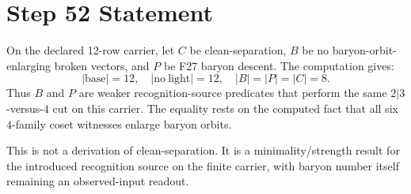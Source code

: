 \documentclass[11pt]{article}
\begin{document}
\section*{Step 52 Statement}
On the declared 12-row carrier, let \(C\) be clean-separation, \(B\) be no baryon-orbit-enlarging broken vectors, and \(P\) be F27 baryon descent. The computation gives:
\[
  |\mathrm{base}|=12,\quad |\mathrm{no\ light}|=12,\quad |B|=|P|=|C|=8.
\]
Thus \(B\) and \(P\) are weaker recognition-source predicates that perform the same \(2|3\)-versus-\(4\) cut on this carrier. The equality rests on the computed fact that all six \(4\)-family coset witnesses enlarge baryon orbits.

This is not a derivation of clean-separation. It is a minimality/strength result for the introduced recognition source on the finite carrier, with baryon number itself remaining an observed-input readout.
\end{document}
